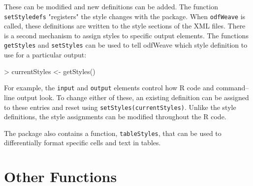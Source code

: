 \documentclass[12pt]{article}
\newcommand{\odfWeaveFunc}{{\tt odfWeave}\xspace}
\begin{document}
These can be modified and new definitions can be added. The function \texttt{setStyledefs} "registers" the style changes with the package. When \odfWeaveFunc is called, these definitions are written to the style sections of the XML files. There is a second mechanism to assign styles to specific output elements. The functions \texttt{getStyles} and \texttt{setStyles} can be used to tell odfWeave which style definition to use for a particular output:

\begin{Schunk}
\begin{Sinput}
> currentStyles <- getStyles()
\end{Sinput}
\end{Schunk}

For example, the \texttt{input} and \texttt{output} elements control how R code and command--line output look. To change either of these, an existing definition can be assigned to these entries and reset using \verb|setStyles(currentStyles)|. Unlike the style definitions, the style assignments can be modified throughout the R code. 

The package also contains a function, \texttt{tableStyles}, that can be used to differentially format specific cells and text in tables.

\section{Other Functions} 
\end{document}
